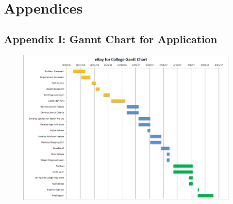 \documentclass[journal,compsoc, 10pt, draftclsnofoot, onecolumn]{IEEEtran}
\begin{document}
\newpage

\section{Appendices}
\subsection{Appendix I: Gannt Chart for Application}

\begin{figure}[h]
\includegraphics[scale =.6]{ganttChart} 
\centering
\end{figure}
\end{document}
